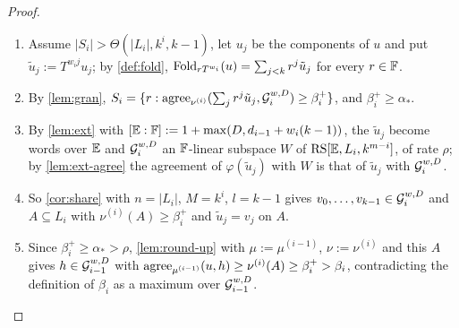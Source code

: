 \begin{proof}\begin{enumerate}
\item Assume $|S_i|>\Theta(|L_i|,k^i,k-1)$, let $u_j$ be the components of $u$ and put $\tilde u_j:=T^{w_ij}u_j$; by \cref{def:fold}, $\mathrm{Fold}_{rT^{w_i}}(u)=\sum_{j<k}r^j\tilde u_j$ for every $r\in\mathbb{F}$.
\item By \cref{lem:gran}, $S_i=\{r:\mathrm{agree}_{\nu^{(i)}}(\sum_jr^j\tilde u_j,\mathcal{G}_i^{w,D})\ge\beta_i^+\}$, and $\beta_i^+\ge\alpha_*$.
\item By \cref{lem:ext} with $[\mathbb{E}:\mathbb{F}]:=1+\max(D,d_{i-1}+w_i(k-1))$, the $\tilde u_j$ become words over $\mathbb{E}$ and $\mathcal{G}_i^{w,D}$ an $\mathbb{F}$-linear subspace $W$ of $\mathrm{RS}[\mathbb{E},L_i,k^{m-i}]$, of rate $\rho$; by \cref{lem:ext-agree} the agreement of $\varphi(\tilde u_j)$ with $W$ is that of $\tilde u_j$ with $\mathcal{G}_i^{w,D}$.
\item So \cref{cor:share} with $n=|L_i|$, $M=k^i$, $l=k-1$ gives $v_0,\dots,v_{k-1}\in\mathcal{G}_i^{w,D}$ and $A\subseteq L_i$ with $\nu^{(i)}(A)\ge\beta_i^+$ and $\tilde u_j=v_j$ on $A$.
\item Since $\beta_i^+\ge\alpha_*>\rho$, \cref{lem:round-up} with $\mu:=\mu^{(i-1)}$, $\nu:=\nu^{(i)}$ and this $A$ gives $h\in\mathcal{G}_{i-1}^{w,D}$ with $\mathrm{agree}_{\mu^{(i-1)}}(u,h)\ge\nu^{(i)}(A)\ge\beta_i^+>\beta_i$, contradicting the definition of $\beta_i$ as a maximum over $\mathcal{G}_{i-1}^{w,D}$.
\end{enumerate}\end{proof}
